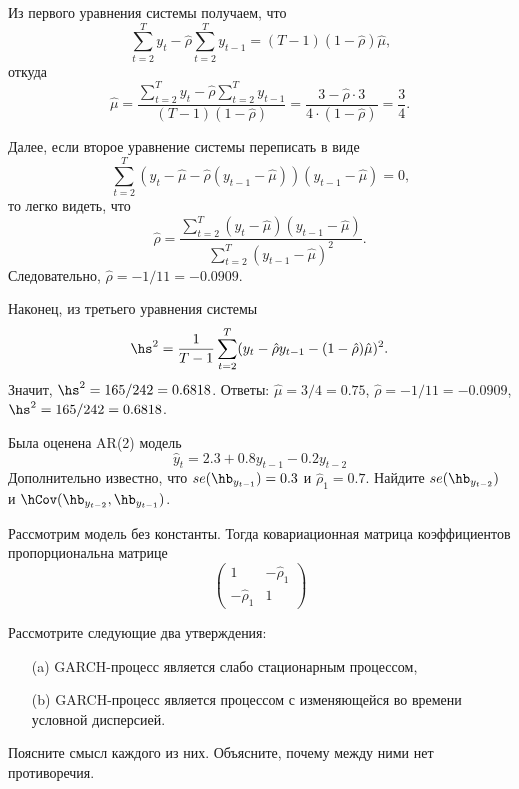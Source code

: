 \documentclass[pdftex,11pt,openany]{book}\usepackage[]{graphicx}\usepackage[]{color}
\begin{document}
\begin{solution}
Из первого уравнения системы получаем, что
\[
\sum_{t=2}^{T}y_{t} - \hat{\rho} \sum_{t=2}^{T}y_{t-1} = (T - 1) (1- \hat{\rho}) \hat{\mu} \text{,}
\]
откуда
\[
\hat{\mu} = \frac{\sum_{t=2}^{T}y_{t} - \hat{\rho} \sum_{t=2}^{T}y_{t-1}}{(T - 1) (1- \hat{\rho})} = \frac{3 - \hat{\rho} \cdot 3}{4\cdot(1-\hat{\rho})} = \frac{3}{4} \text{.}
\]

Далее, если второе уравнение системы переписать в виде
\[
\sum_{t=2}^{T}(y_t - \hat{\mu} - \hat{\rho} (y_{t-1} - \hat{\mu}))(y_{t-1} - \hat{\mu}) = 0 \text{,}
\]
то легко видеть, что
\[
\hat{\rho} = \frac{\sum_{t=2}^{T}(y_t - \hat{\mu})(y_{t-1} - \hat{\mu})}{\sum_{t=2}^{T}(y_{t-1} - \hat{\mu})^2} \text{.}
\]
Следовательно, $\hat{\rho} =-1/11= -0.0909$.

Наконец, из третьего уравнения системы
\[
\hs^2 =\frac{1}{T-1} \sum_{t=2}^{T}(y_t - \hat{\rho} y_{t-1} - (1 - \hat{\rho}) \hat{\mu})^2 \text{.}
\]
Значит, $\hs^2 = 165/242= 0.6818$. Ответы: $\hat{\mu} = 3/4= 0.75$, $\hat{\rho} = -1/11=-0.0909$, $\hs^2 =165/242=0.6818$.
\end{solution}


\begin{problem}
Была оценена AR(2) модель
\[
\hat{y}_t=2.3+0.8 y_{t-1}-0.2 y_{t-2}
\]
Дополнительно известно, что $se(\hb_{y_{t-1}})=0.3$ и $\hat{\rho}_1=0.7$. Найдите $se(\hb_{y_{t-2}})$ и $\hCov(\hb_{y_{t-2}},\hb_{y_{t-1}})$.
\end{problem}

\begin{solution}
Рассмотрим модель без константы. Тогда ковариационная матрица коэффициентов пропорциональна матрице
\[
\begin{pmatrix}
1 & -\hat{\rho}_1 \\
-\hat{\rho}_1 & 1
\end{pmatrix}
\]
\end{solution}



\begin{problem}
Рассмотрите следующие два утверждения:
\begin{itemize}
  \item[(a)] GARCH-процесс является слабо стационарным процессом,
  \item[(b)] GARCH-процесс является процессом с изменяющейся во времени условной дисперсией.
\end{itemize}
Поясните смысл каждого из них. Объясните, почему между ними нет противоречия.
\end{problem}
\end{document}
